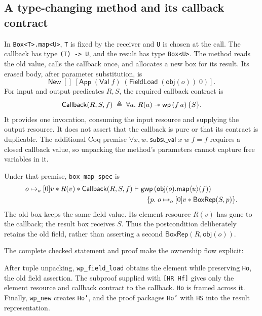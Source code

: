 \subsection{A type-changing method and its callback contract}
\label{sec:generic-map}

In \texttt{Box<T>.map<U>}, \texttt{T} is fixed by the receiver and
\texttt{U} is chosen at the call. The callback has type \texttt{(T) -> U},
and the result has type \texttt{Box<U>}. The method reads the old value,
calls the callback once, and allocates a new box for its result.
Its erased body, after parameter substitution, is
\[
 \mathsf{New}\;[]\;
   [\mathsf{App}\;(\mathsf{Val}\;f)
      \;(\mathsf{FieldLoad}\;(\mathsf{obj}(o))\;0)].
\]
For input and output predicates \(R,S\), the required callback contract is
\[
\mathsf{Callback}(R,S,f)\;\triangleq\;
 \forall a.\;R(a)\mathbin{-\!\!*}\mathsf{wp}\,(f\,a)\,\{S\}.
\]
It provides one invocation, consuming the input resource and supplying the
output resource. It does not assert that the callback is pure or that its
contract is duplicable. The additional Coq premise
\(\forall x,w.\;\mathsf{subst\_val}\;x\;w\;f=f\) requires a closed
callback value, so unpacking the method's parameters cannot capture free
variables in it.

Under that premise, \texttt{box\_map\_spec} is
\[
\begin{aligned}
o\mathrel{\mapsto_{o}}[0]v\mathbin{*} R(v)\mathbin{*}\mathsf{Callback}(R,S,f)
 &\vdash \mathsf{gwp}\,
   (\mathsf{obj}(o).\mathsf{map}\langle u\rangle(f))\\
 &\qquad\{p.\;o\mathrel{\mapsto_{o}}[0]v\mathbin{*}\mathsf{BoxRep}(S,p)\}.
\end{aligned}
\]
The old box keeps the same field value. Its element resource \(R(v)\)
has gone to the callback; the result box receives \(S\). Thus the
postcondition deliberately retains the old field, rather than asserting
a second \(\mathsf{BoxRep}(R,\mathsf{obj}(o))\).

The complete checked statement and proof make the ownership flow explicit:

After tuple unpacking, \texttt{wp\_field\_load} obtains the element while
preserving \texttt{Ho}, the old field assertion. The subproof supplied
with \texttt{[HR Hf]} gives only the element resource and callback contract
to the callback. \texttt{Ho} is framed across it. Finally,
\texttt{wp\_new} creates \texttt{Ho'}, and the proof packages
\texttt{Ho'} with \texttt{HS} into the result representation.

